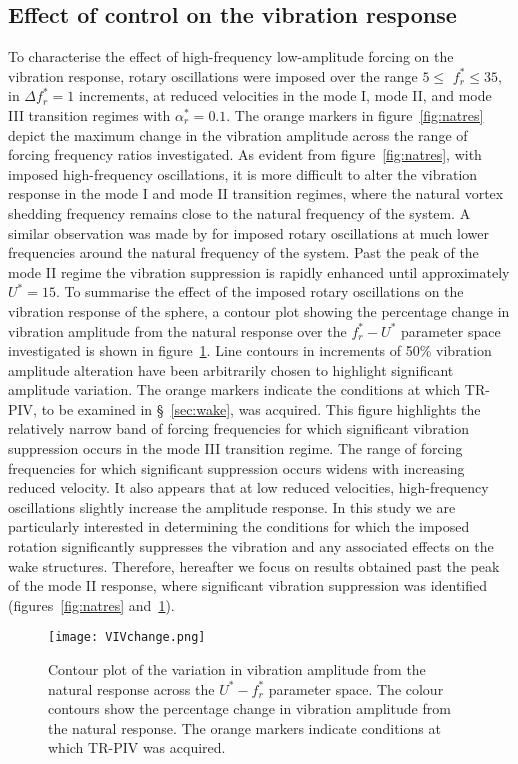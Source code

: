 \documentclass[3p]{elsarticle}
\newcommand{\Ustar}{\ensuremath{U^{*}}}
\newcommand{\velrat}{\ensuremath{\alpha_r^*}}
\newcommand{\freqrat}{\ensuremath{f_r^*}}
\begin{document}
\subsection{Effect of control on the vibration response}%
To characterise the effect of high-frequency low-amplitude forcing on
the vibration response, rotary oscillations were imposed over the
range $5\leqslant$ $\freqrat\leqslant35$, in $\Delta\freqrat=1$
increments, at reduced velocities in the mode I, mode II, and
mode III transition regimes with $\velrat=0.1$. The orange
markers in figure~\ref{fig:natres} depict the maximum change in the
vibration amplitude across the range of forcing frequency ratios
investigated. As evident from figure~\ref{fig:natres}, with imposed
high-frequency oscillations, it is more difficult to alter the
vibration response in the mode I and mode II transition regimes,
where the natural vortex shedding frequency remains
close to the natural frequency of the system. A similar observation
was made by \citet{Sareen2018b} for imposed rotary
oscillations at much lower frequencies around the natural frequency of
the system. Past the peak of the mode II regime the vibration
suppression is rapidly enhanced until approximately $\Ustar=15$. To summarise the effect of the imposed rotary oscillations on the
vibration response of the sphere, a contour plot showing the
percentage change in vibration amplitude from the natural response
over the $\freqrat - \Ustar$ parameter space investigated is shown in
figure~\ref{fig:combo}. Line contours in increments of 50\% vibration amplitude alteration have been arbitrarily chosen to highlight significant amplitude variation. The orange markers indicate the conditions at
which TR-PIV, to be examined in \S~\ref{sec:wake}, was acquired.
This figure highlights the relatively narrow band of forcing
frequencies for which significant vibration suppression occurs in the
mode III transition regime. The range of forcing frequencies for which significant suppression occurs widens with increasing reduced velocity. It also appears that at low reduced
velocities, high-frequency oscillations slightly increase the
amplitude response. In this study we are particularly interested in determining the conditions for which the imposed rotation significantly suppresses the vibration and any associated effects on the wake structures. Therefore, hereafter we focus on results obtained past the peak of the mode II response, where significant vibration suppression was identified (figures~\ref{fig:natres} and~\ref{fig:combo}). 
%
\begin{figure}
	\centering
	\texttt{[image: VIVchange.png]} %
	\caption{Contour plot of the variation in vibration amplitude
		from the natural response across the $\Ustar - \freqrat$ parameter space. The colour contours show the
		percentage change in vibration amplitude from the natural
		response. The orange markers indicate conditions at which
		TR-PIV was acquired.}
	\label{fig:combo}
\end{figure}
%
\end{document}
